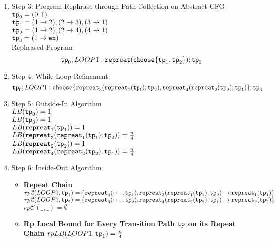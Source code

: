 \begin{example}
\begin{enumerate}
    \item Step 3: Program Rephrase through Path Collection on Abstract CFG
    \\
    $\mathtt{tp}_0 = (0, 1)$
    \\
    $\mathtt{tp}_1 = (1 \to 2), (2 \to 3), (3 \to 1)$
    \\
    $\mathtt{tp}_2 = (1 \to 2), (2 \to 4), (4 \to 1)$
    \\
    $\mathtt{tp}_3 = (1 \to \mathtt{ex})$
    \\
    Rephrased Program
    \[
    \mathtt{tp}_0 ; LOOP1: \mathtt{repreat}(\mathtt{choose}\{\mathtt{tp}_1, \mathtt{tp}_2 \}); \mathtt{tp}_3
    \]
    \item Step 4: While Loop Refinement:
    \[
      \mathtt{tp}_0 ; LOOP1: \mathtt{choose}\{\mathtt{repreat}_3(\mathtt{repreat}_1(\mathtt{tp}_1); \mathtt{tp}_2) , \mathtt{repreat}_4(\mathtt{repreat}_2(\mathtt{tp}_2); \mathtt{tp}_1) \}; \mathtt{tp}_3
      \]
    \item Step 5: Outside-In Algorithm
    \\
    $LB(\mathtt{tp}_0) = 1$
    \\
    $LB(\mathtt{tp}_3) = 1$
    \\
    $LB(\mathtt{repreat}_1(\mathtt{tp}_1)) = 1 $
    \\
    $LB(\mathtt{repreat}_3(\mathtt{repreat}_1(\mathtt{tp}_1); \mathtt{tp}_2)) = \frac{n}{4} $
    \\
    $LB(\mathtt{repreat}_2(\mathtt{tp}_2)) = 1 $
    \\
    $LB(\mathtt{repreat}_4(\mathtt{repreat}_2(\mathtt{tp}_2); \mathtt{tp}_1)) = \frac{n}{4} $
    \item Step 6: Inside-Out Algorithm
    \begin{itemize}
      \item \textbf{Repeat Chain}
      \\
      $rp\mathcal{C}(LOOP1, \mathtt{tp}_1) = \{\mathtt{repreat}_4(\cdots, \mathtt{tp}_1), \mathtt{repreat}_3(\mathtt{repreat}_1(\mathtt{tp}_1); \mathtt{tp}_2) \to \mathtt{repreat}_1(\mathtt{tp}_1)\}$ \\
      $rp\mathcal{C}(LOOP1, \mathtt{tp}_2) = \{\mathtt{repreat}_3(\cdots, \mathtt{tp}_2), \mathtt{repreat}_4(\mathtt{repreat}_2(\mathtt{tp}_2); \mathtt{tp}_1) \to \mathtt{repreat}_2(\mathtt{tp}_2)\}$ \\
      $rp\mathcal{C}(\_, \_) = \emptyset$ 
      \item \textbf{Rp Local Bound for Every Transition Path $\mathtt{tp}$ on its Repeat Chain}
      $rpLB(LOOP1, \mathtt{tp}_1) = \frac{n}{4}$ \\

\end{itemize}
\end{enumerate}
\end{example}
